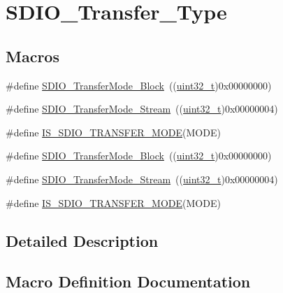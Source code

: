 \hypertarget{group___s_d_i_o___transfer___type}{}\section{S\+D\+I\+O\+\_\+\+Transfer\+\_\+\+Type}
\label{group___s_d_i_o___transfer___type}
\subsection*{Macros}
\begin{DoxyCompactItemize}
\item 
\#define \hyperlink{group___s_d_i_o___transfer___type_ga5b54ada18cc4072ceff1d98ee4b69972}{S\+D\+I\+O\+\_\+\+Transfer\+Mode\+\_\+\+Block}~((\hyperlink{_p_e___types_8h_a33594304e786b158f3fb30289278f5af}{uint32\+\_\+t})0x00000000)
\item 
\#define \hyperlink{group___s_d_i_o___transfer___type_gadd0cafe0a80e6b6cc5c22d838cbb2e28}{S\+D\+I\+O\+\_\+\+Transfer\+Mode\+\_\+\+Stream}~((\hyperlink{_p_e___types_8h_a33594304e786b158f3fb30289278f5af}{uint32\+\_\+t})0x00000004)
\item 
\#define \hyperlink{group___s_d_i_o___transfer___type_gaf7565ea93f9ed01558bdc9ad80dac763}{I\+S\+\_\+\+S\+D\+I\+O\+\_\+\+T\+R\+A\+N\+S\+F\+E\+R\+\_\+\+M\+O\+DE}(M\+O\+DE)
\item 
\#define \hyperlink{group___s_d_i_o___transfer___type_ga5b54ada18cc4072ceff1d98ee4b69972}{S\+D\+I\+O\+\_\+\+Transfer\+Mode\+\_\+\+Block}~((\hyperlink{_p_e___types_8h_a33594304e786b158f3fb30289278f5af}{uint32\+\_\+t})0x00000000)
\item 
\#define \hyperlink{group___s_d_i_o___transfer___type_gadd0cafe0a80e6b6cc5c22d838cbb2e28}{S\+D\+I\+O\+\_\+\+Transfer\+Mode\+\_\+\+Stream}~((\hyperlink{_p_e___types_8h_a33594304e786b158f3fb30289278f5af}{uint32\+\_\+t})0x00000004)
\item 
\#define \hyperlink{group___s_d_i_o___transfer___type_gaf7565ea93f9ed01558bdc9ad80dac763}{I\+S\+\_\+\+S\+D\+I\+O\+\_\+\+T\+R\+A\+N\+S\+F\+E\+R\+\_\+\+M\+O\+DE}(M\+O\+DE)
\end{DoxyCompactItemize}


\subsection{Detailed Description}


\subsection{Macro Definition Documentation}
